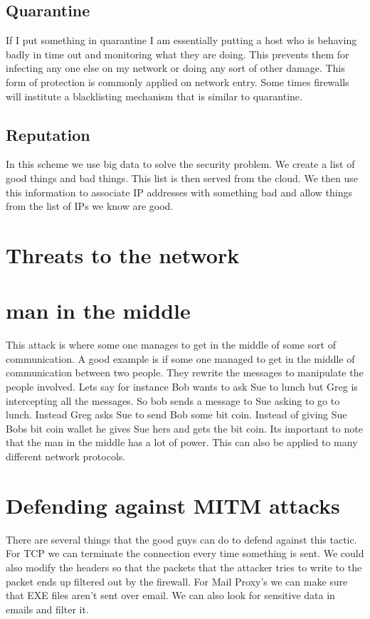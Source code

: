 \documentclass[letterpaper, onecolumn,10pt]{IEEEtran}
\begin{document}
			    \subsection{Quarantine}
			    If I put something in quarantine I am essentially putting a host who is behaving badly in time out and monitoring what they are doing. This prevents them for infecting any one else on my network or doing any sort of other damage. This form of protection is commonly applied on network entry. Some times firewalls will institute a blacklisting mechanism that is similar to quarantine.\\
			    
			    \subsection{Reputation}
			    In this scheme we use big data to solve the security problem. We create a list of good things and bad things. This list is then served from the cloud. We then use this information to associate IP addresses with something bad and allow things from the list of IPs we know are good.\\

            \section{Threats to the network}
		        \section{man in the middle}
		        This attack is where some one manages to get in the middle of some sort of communication. A good example is if some one managed to get in the middle of communication between two people. They rewrite the messages to manipulate the people involved. Lets say for instance Bob wants to ask Sue to lunch but Greg is intercepting all the messages. So bob sends a message to Sue asking to go to lunch. Instead Greg asks Sue to send Bob some bit coin. Instead of giving Sue Bobs bit coin wallet he gives Sue hers and gets the bit coin. Its important to note that the man in the middle has a lot of power. This can also be applied to many different network protocols.\\
		        
		        \section{Defending against MITM attacks}
		        There are several things that the good guys can do to defend against this tactic. For TCP we can terminate the connection every time something is sent. We could also modify the headers so that the packets that the attacker tries to write to the packet ends up filtered out by the firewall. For Mail Proxy's we can make sure that EXE files aren't sent over email. We can also look for sensitive data in emails and filter it.\\
		        
\end{document}
